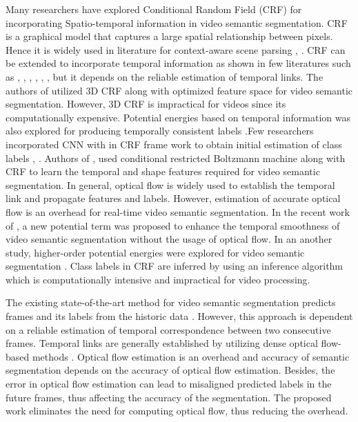 \documentclass[journal]{IEEEtran}
\begin{document}
Many researchers have explored Conditional Random Field (CRF) for incorporating Spatio-temporal information in video semantic segmentation. CRF is a graphical model that captures a large spatial relationship between pixels. Hence it is widely used in literature for context-aware scene parsing \cite{3}, \cite{6}. 
 CRF can be extended to incorporate temporal information as shown in few literatures such as \cite{5}, \cite{6}, \cite{8}, \cite{9}, \cite{10}, \cite{12}, but it depends on the reliable estimation of temporal links. The authors of \cite{5} utilized 3D CRF along with optimized feature space for video semantic segmentation. However, 3D CRF is impractical for videos since its computationally expensive. Potential energies based on temporal information was also explored for producing temporally consistent labels \cite{9}.Few researchers incorporated CNN with in CRF frame work to obtain initial estimation of class labels \cite{8}, \cite{12}. Authors of \cite{10}, used conditional restricted Boltzmann machine along with CRF to learn the temporal and shape features required for video semantic segmentation. 
In general, optical flow is widely used to establish the temporal link and propagate features and labels. However, estimation of accurate optical flow is an overhead for real-time video semantic segmentation. In the recent work of \cite{girisha2020semantic}, a new potential term was proposed to enhance the temporal smoothness of video semantic segmentation without the usage of optical flow. In an another study, higher-order potential energies were explored for video semantic segmentation \cite{6}. Class labels in CRF are inferred by using an inference algorithm which is computationally intensive and impractical for video processing.


\par The existing state-of-the-art method for video semantic segmentation predicts frames and its labels from the historic data \cite{22}. However, this approach is dependent on a reliable estimation of temporal correspondence between two consecutive frames. Temporal links are generally established by utilizing dense optical flow-based methods \cite{5}. Optical flow estimation is an overhead and accuracy of semantic segmentation depends on the accuracy of optical flow estimation. Besides, the error in optical flow estimation can lead to misaligned predicted labels in the future frames, thus affecting the accuracy of the segmentation. The proposed work eliminates the need for computing optical flow, thus reducing the overhead. 
\end{document}
